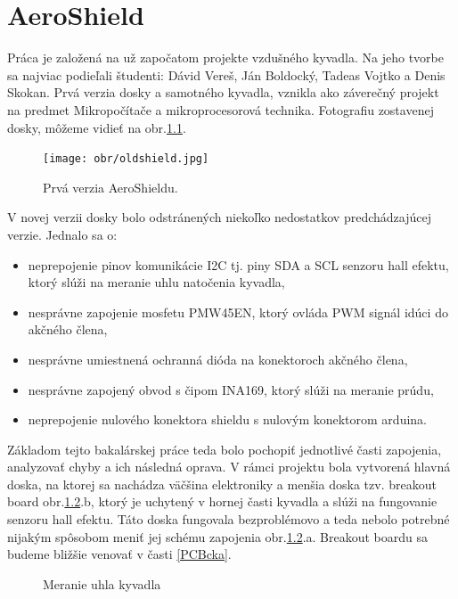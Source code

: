 \chapter{AeroShield}

Práca je založená na už započatom projekte vzdušného kyvadla. Na jeho tvorbe sa najviac podieľali študenti: Dávid Vereš, Ján Boldocký, Tadeas Vojtko a Denis Skokan. Prvá verzia dosky a samotného kyvadla, vznikla ako záverečný projekt na predmet Mikropočítače a mikroprocesorová technika. Fotografiu zostavenej dosky, môžeme vidieť na obr.\ref{OBRAZOK 2.1.1}.


\begin{figure}[tbh]
	\centering
	\texttt{[image: obr/oldshield.jpg]}
	\caption{Prvá verzia AeroShieldu. }\label{OBRAZOK 2.1.1}
\end{figure}


V novej verzii dosky bolo odstránených niekoľko nedostatkov predchádzajúcej verzie. Jednalo sa o:

\begin{itemize}
	\item neprepojenie pinov komunikácie I2C tj. piny SDA a SCL senzoru hall efektu, ktorý slúži na meranie uhlu natočenia kyvadla,
	\item nesprávne zapojenie mosfetu PMW45EN, ktorý ovláda PWM signál idúci do akčného člena,
	\item nesprávne umiestnená ochranná dióda na konektoroch akčného člena,
	\item nesprávne zapojený obvod s čipom INA169, ktorý slúži na meranie prúdu,
	\item neprepojenie nulového konektora shieldu s nulovým konektorom arduina.
\end{itemize}

Základom tejto bakalárskej práce teda bolo pochopiť jednotlivé časti zapojenia, analyzovať chyby a ich následná oprava. V rámci projektu bola vytvorená hlavná doska, na ktorej sa nachádza väčšina elektroniky a menšia doska tzv. breakout board obr.\ref{OBRAZOK 2.1.2}.b, ktorý je uchytený v hornej časti kyvadla a slúži na fungovanie senzoru hall efektu. Táto doska fungovala bezproblémovo a teda nebolo potrebné nijakým spôsobom meniť jej schému zapojenia obr.\ref{OBRAZOK 2.1.2}.a. Breakout boardu sa budeme bližšie venovať v časti \ref{PCBcka}.

\begin{figure}[!tbh]
	\hfill
	\hfill
	\hfill
	\caption{Meranie uhla kyvadla}\label{OBRAZOK 2.1.2}
\end{figure}


